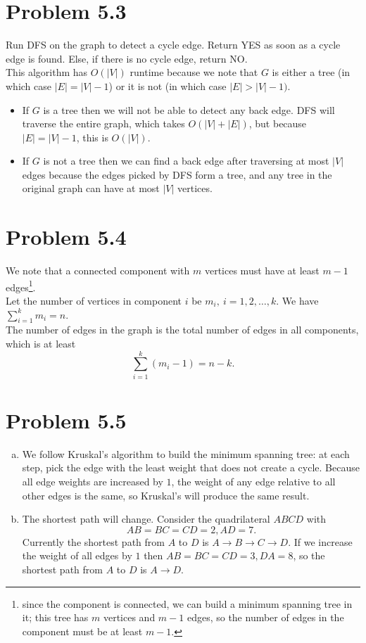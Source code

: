 \documentclass[12pt]{report}
\begin{document}
\section{Problem 5.3}
Run DFS on the graph to detect a cycle edge. Return YES as soon as a cycle edge is found. Else, if there is no cycle edge, return NO.\\
This algorithm has $O(|V|)$ runtime because we note that $G$ is either a tree (in which case $|E| = |V| - 1$) or it is not (in which case $|E| > |V| - 1)$.
\begin{itemize}
  \item If $G$ is a tree then we will not be able to detect any back edge. DFS will traverse the entire graph, which takes $O(|V| + |E|)$, but because $|E| = |V| - 1$, this is $O(|V|)$.
  \item If $G$ is not a tree then we can find a back edge after traversing at most $|V|$ edges because the edges picked by DFS form a tree, and any tree in the original graph can have at most $|V|$ vertices.
\end{itemize}

\section{Problem 5.4}
We note that a connected component with $m$ vertices must have at least $m - 1$ edges\footnote{since the component is connected, we can build a minimum spanning tree in it; this tree has $m$ vertices and $m-1$ edges, so the number of edges in the component must be at least $m-1$.}. \\
Let the number of vertices in component $i$ be $m_i, \ i = 1,2,\ldots,k$. We have $\displaystyle \sum_{i=1}^k m_i = n$.\\
The number of edges in the graph is the total number of edges in all components, which is at least $$\sum_{i=1}^k (m_i - 1) = n - k.$$


\section{Problem 5.5}
\begin{enumerate}[(a)]
  \item We follow Kruskal's algorithm to build the minimum spanning tree: at each step, pick the edge with the least weight that does not create a cycle. Because all edge weights are increased by $1$, the weight of any edge relative to all other edges is the same, so Kruskal's will produce the same result.
  \item The shortest path will change. Consider the quadrilateral $ABCD$ with $$AB = BC = CD = 2, AD = 7.$$ Currently the shortest path from $A$ to $D$ is $A \to B \to C \to D$. If we increase the weight of all edges by $1$ then $AB = BC = CD = 3, DA = 8$, so the shortest path from $A$ to $D$ is $A \to D$.
\end{enumerate}
\end{document}
